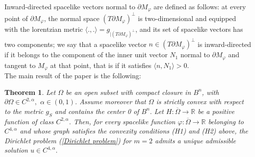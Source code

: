 \documentclass[10pt,reqno,oneside]{amsart}
\newtheorem{thm}[lem]{Theorem}
\theoremstyle{definition}
\theoremstyle{remark}
\newcommand{\R}{\mathbb{R}}
\begin{document}
Inward-directed spacelike vectors normal to $\partial M_{\varphi}$ are defined as follows: at every point of $\partial M_{\varphi}$, the normal space $(T\partial M_{\varphi})^{\perp}$ is two-dimensional and equipped with the lorentzian metric $\langle.,.\rangle=g_{|(T\partial M_{\varphi})^{\perp}}$, and its set of spacelike vectors has two components; we say that a spacelike vector $n\in(T\partial M_{\varphi})^{\perp}$ is inward-directed if it belongs to the component of the inner unit vector $N_1$ normal to $\partial M_{\varphi}$ and tangent to $M_{\varphi}$ at that point, that is if it satisfies $\langle n,N_1\rangle>0$. 
\\

The main result of the paper is the following:
\begin{thm} \label{dp main thm}
Let $\Omega$ be an open subset with compact closure in $B^n$, with $\partial\Omega\in C^{2,\alpha},$ $\alpha\in (0,1)$. Assume moreover that $\Omega$ is strictly convex with respect to the metric $g_S$ and contains the center 0 of $B^n.$ Let $H:\overline{\Omega}\rightarrow\R$ be a positive function of class $C^{2,\alpha}$. Then, for every spacelike function $\varphi:\overline{\Omega}\rightarrow\R$ belonging to $C^{4,\alpha}$ and whose graph satisfies the convexity conditions (H1) and (H2) above, the Dirichlet problem (\ref{Dirichlet problem}) for $m=2$ admits a unique admissible solution $u\in C^{4,\alpha}.$ 
\end{thm}
\end{document}
